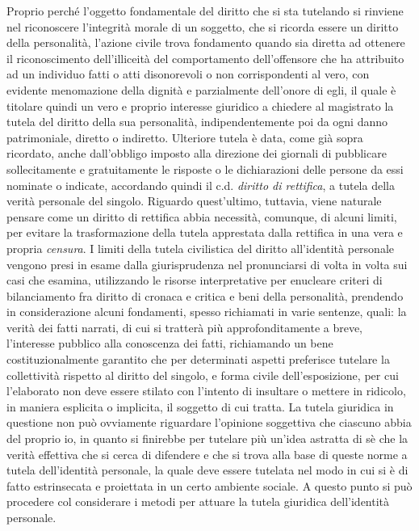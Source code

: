 Proprio perché l'oggetto fondamentale del diritto che si sta tutelando si rinviene nel riconoscere l'integrità morale di un soggetto, che si ricorda essere un diritto della personalità, l’azione civile trova fondamento quando sia diretta ad ottenere il riconoscimento dell’illiceità del comportamento dell’offensore che ha attribuito ad un individuo fatti o atti disonorevoli o non corrispondenti al vero, con evidente menomazione della dignità e parzialmente dell’onore di egli, il quale è titolare quindi un vero e proprio interesse giuridico a chiedere al magistrato la tutela del diritto della sua personalità, indipendentemente poi da ogni danno patrimoniale, diretto o indiretto.
Ulteriore tutela è data, come già sopra ricordato, anche dall’obbligo imposto alla direzione dei giornali di pubblicare sollecitamente e gratuitamente le risposte o le dichiarazioni delle persone da essi nominate o indicate, accordando quindi il c.d. \textit{diritto di rettifica}, a tutela della verità personale del singolo.
Riguardo quest'ultimo, tuttavia, viene naturale pensare come un diritto di rettifica abbia necessità, comunque, di alcuni limiti, per evitare la trasformazione della tutela apprestata dalla rettifica in una vera e propria \textit{censura}. I limiti della tutela civilistica del diritto all’identità personale vengono presi in esame dalla giurisprudenza nel pronunciarsi di volta in volta sui casi che esamina, utilizzando le risorse interpretative per enucleare criteri di bilanciamento fra diritto di cronaca e critica e beni della personalità, prendendo in considerazione alcuni fondamenti, spesso richiamati in varie sentenze, quali: la verità dei fatti narrati, di cui si tratterà più approfonditamente a breve, l'interesse pubblico alla conoscenza dei fatti, richiamando un bene costituzionalmente garantito che per determinati aspetti preferisce tutelare la collettività rispetto al diritto del singolo,  e forma civile dell’esposizione, per cui l'elaborato non deve essere stilato con l'intento di insultare o mettere in ridicolo, in maniera esplicita o implicita, il soggetto di cui tratta. La tutela giuridica in questione non può ovviamente riguardare l’opinione soggettiva che ciascuno abbia del proprio io, in quanto si finirebbe per tutelare più un'idea astratta di sè che la verità effettiva che si cerca di difendere e che si trova alla base di queste norme a tutela dell'identità personale, la quale deve essere tutelata nel modo in cui si è di fatto estrinsecata e proiettata in un certo ambiente sociale.
A questo punto si può procedere col considerare i metodi per attuare la tutela giuridica dell'identità personale.
